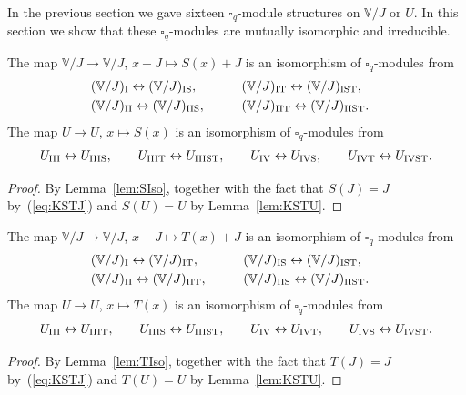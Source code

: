 In the previous section we gave sixteen $\square_q$-module structures on $\mathbb V/J$ or $U$. In this section we show that these $\square_q$-modules are mutually isomorphic and irreducible.

\begin{Proposition}\label{prop:Smix} The map $\mathbb V/J\to \mathbb V/J$, $x+J\mapsto S(x)+J$ is an isomorphism of $\square_q$-modules from
\begin{alignat*}{3}
&(\mathbb V/J)_{\rm I} \leftrightarrow (\mathbb V/J)_{\rm IS}, \qquad &&
(\mathbb V/J)_{\rm IT} \leftrightarrow (\mathbb V/J)_{\rm IST},&\\
&(\mathbb V/J)_{\rm II} \leftrightarrow (\mathbb V/J)_{\rm IIS}, \qquad &&
(\mathbb V/J)_{\rm IIT} \leftrightarrow (\mathbb V/J)_{\rm IIST}.&
\end{alignat*}
The map $U \to U$, $x \mapsto S(x)$ is an isomorphism of $\square_q$-modules from
\begin{gather*}
U_{\rm III} \leftrightarrow U_{\rm IIIS}, \qquad
U_{\rm IIIT} \leftrightarrow U_{\rm IIIST}, \qquad
U_{\rm IV} \leftrightarrow U_{\rm IVS}, \qquad
U_{\rm IVT} \leftrightarrow U_{\rm IVST}.
\end{gather*}
\end{Proposition}
\begin{proof} By Lemma~\ref{lem:SIso}, together with the fact that $S(J)=J$ by~(\ref{eq:KSTJ}) and $S(U)=U$ by Lemma~\ref{lem:KSTU}.
\end{proof}

\begin{Proposition}\label{prop:Tmix}The map $\mathbb V/J\to \mathbb V/J$, $x+J\mapsto T(x)+J$ is an isomorphism of $\square_q$-modules from
\begin{alignat*}{3}
& (\mathbb V/J)_{\rm I} \leftrightarrow (\mathbb V/J)_{\rm IT}, \qquad &&
(\mathbb V/J)_{\rm IS} \leftrightarrow (\mathbb V/J)_{\rm IST},&\\
&(\mathbb V/J)_{\rm II} \leftrightarrow (\mathbb V/J)_{\rm IIT}, \qquad &&
(\mathbb V/J)_{\rm IIS} \leftrightarrow (\mathbb V/J)_{\rm IIST}.&
\end{alignat*}
The map $U \to U$, $x \mapsto T(x)$ is an isomorphism of $\square_q$-modules from
\begin{gather*}
 U_{\rm III} \leftrightarrow U_{\rm IIIT}, \qquad
U_{\rm IIIS} \leftrightarrow U_{\rm IIIST}, \qquad
U_{\rm IV} \leftrightarrow U_{\rm IVT}, \qquad
U_{\rm IVS} \leftrightarrow U_{\rm IVST}.
\end{gather*}
\end{Proposition}
\begin{proof} By Lemma~\ref{lem:TIso}, together with the fact that $T(J)=J$ by~(\ref{eq:KSTJ}) and $T(U)=U$ by Lemma~\ref{lem:KSTU}.
\end{proof}

